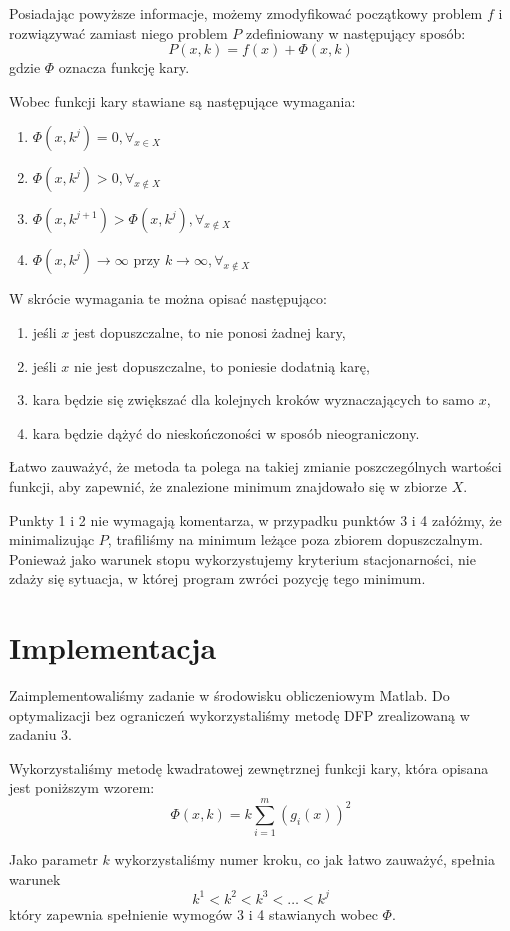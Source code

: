 \documentclass{classrep}
\begin{document}
Posiadając powyższe informacje, możemy zmodyfikować początkowy problem $f$ i rozwiązywać zamiast niego problem $P$ zdefiniowany w następujący sposób:
\begin{equation}
 P(x, k) = f(x) + \Phi(x, k)
\end{equation}
gdzie $\Phi$ oznacza funkcję kary.

Wobec funkcji kary stawiane są następujące wymagania:
\begin{enumerate}
 \item $\Phi(x, k^j) = 0, \displaystyle \forall_{x \in X}$
 \item $\Phi(x, k^j) > 0, \displaystyle \forall_{x \notin X}$
 \item $\Phi(x, k^{j + 1}) > \Phi(x, k^j), \displaystyle \forall_{x \notin X}$
 \item $\Phi(x, k^j) \rightarrow \infty \mbox{ przy } k \rightarrow \infty, \displaystyle \forall_{x \notin X}$
\end{enumerate}

W skrócie wymagania te można opisać następująco:
\begin{enumerate}
 \item jeśli $x$ jest dopuszczalne, to nie ponosi żadnej kary,
 \item jeśli $x$ nie jest dopuszczalne, to poniesie dodatnią karę,
 \item kara będzie się zwiększać dla kolejnych kroków wyznaczających to samo $x$,
 \item kara będzie dążyć do nieskończoności w sposób nieograniczony.
\end{enumerate}

Łatwo zauważyć, że metoda ta polega na takiej zmianie poszczególnych wartości funkcji, aby zapewnić, że znalezione minimum znajdowało się w zbiorze $X$.

Punkty 1 i 2 nie wymagają komentarza, w przypadku punktów 3 i 4 załóżmy, że minimalizując $P$, trafiliśmy na minimum leżące poza zbiorem dopuszczalnym. Ponieważ jako warunek stopu wykorzystujemy kryterium stacjonarności, nie zdaży się sytuacja, w której program zwróci pozycję tego minimum.

\section{Implementacja}
Zaimplementowaliśmy zadanie w środowisku obliczeniowym Matlab. Do optymalizacji bez ograniczeń wykorzystaliśmy metodę DFP zrealizowaną w zadaniu 3.

Wykorzystaliśmy metodę kwadratowej zewnętrznej funkcji kary, która opisana jest poniższym wzorem:
\begin{equation}
 \Phi(x, k) = k \displaystyle \sum^{m}_{i = 1} (g_i(x))^2
\end{equation}

Jako parametr $k$ wykorzystaliśmy numer kroku, co jak łatwo zauważyć, spełnia warunek
\begin{equation}
 k^1 < k^2 < k^3 < \ldots < k^j
\end{equation}
który zapewnia spełnienie wymogów 3 i 4 stawianych wobec $\Phi$.
\end{document}
